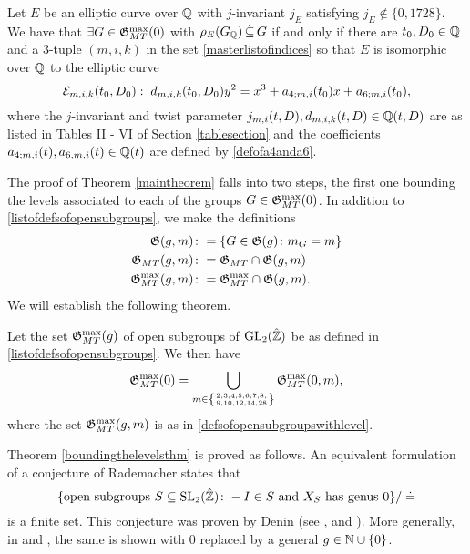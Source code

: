 \begin{Theorem} \label{maintheorem}
Let $E$ be an elliptic curve over $\mathbb{Q}$ with $j$-invariant $j_E$ satisfying $j_E \notin \{ 0, 1728 \}$.  We have that $\exists G \in \mathfrak{G}_{MT}^{\max}(0)$ with $\rho_E(G_{\mathbb{Q}}) \, \dot\subseteq \, G$ if and only if there are $t_0,D_0 \in \mathbb{Q}$ and a $3$-tuple $(m,i,k)$ in the set \eqref{masterlistofindices} so that $E$ is isomorphic over $\mathbb{Q}$ to the elliptic curve
\[
\mathcal{E}_{m,i,k}(t_0,D_0) : \; d_{m,i,k}(t_0,D_0) y^2 = x^3 + a_{4;m,i}(t_0)x + a_{6;m,i}(t_0),
\]
where the $j$-invariant and twist parameter $j_{m,i}(t,D), d_{m,i,k}(t,D) \in \mathbb{Q}(t,D)$ are as listed in Tables II - VI of Section \ref{tablesection} and the coefficients $a_{4;m,i}(t), a_{6,m,i}(t) \in \mathbb{Q}(t)$ are defined by \eqref{defofa4anda6}.
\end{Theorem}
The proof of Theorem \ref{maintheorem} falls into two steps, the first one bounding the levels associated to each of the groups $G \in \mathfrak{G}_{MT}^{\max}(0)$.  In addition to \eqref{listofdefsofopensubgroups}, we make the definitions
\begin{equation} \label{defsofopensubgroupswithlevel}
\begin{split}
\mathfrak{G}(g,m) &\colon= \{ G \in \mathfrak{G}(g) \colon m_G = m \} \\
\mathfrak{G}_{MT}(g,m) &\colon= \mathfrak{G}_{MT} \cap \mathfrak{G}(g,m) \\
\mathfrak{G}_{MT}^{\max}(g,m) &\colon= \mathfrak{G}_{MT}^{\max} \cap \mathfrak{G}(g,m).
\end{split}
\end{equation}
We will establish the following theorem.
 \begin{Theorem} \label{boundingthelevelsthm}
Let the set $\mathfrak{G}_{MT}^{\max}(g)$ of open subgroups of $\operatorname{GL}_2(\hat{\mathbb{Z}})$ be as defined in \eqref{listofdefsofopensubgroups}.  We then have
\begin{equation} \label{genuszerocurvesbylevel}
\mathfrak{G}_{MT}^{\max}(0) = \bigcup_{m \in \left\{ 2, 3, 4, 5, 6, 7, 8, \atop 9, 10, 12, 14, 28 \right\}} \mathfrak{G}_{MT}^{\max}(0,m),
\end{equation}
where the set $\mathfrak{G}_{MT}^{\max}(g,m)$ is as in \eqref{defsofopensubgroupswithlevel}.
\end{Theorem}
Theorem \ref{boundingthelevelsthm} is proved as follows.  An equivalent formulation of a conjecture of  Rademacher states that
\[
\{ \text{open subgroups } S \subseteq \operatorname{SL}_2(\hat{\mathbb{Z}}) \colon -I \in S \text{ and } X_S \text{ has genus } 0 \} / \doteq
\]
is a finite set.  
This conjecture was proven by Denin (see \cite{denin1}, \cite{denin2} and \cite{denin3}).  More generally, in \cite{thompson} and \cite{zograf}, the same is shown with $0$ replaced by a general $g \in \mathbb{N} \cup \{ 0 \}$. 
